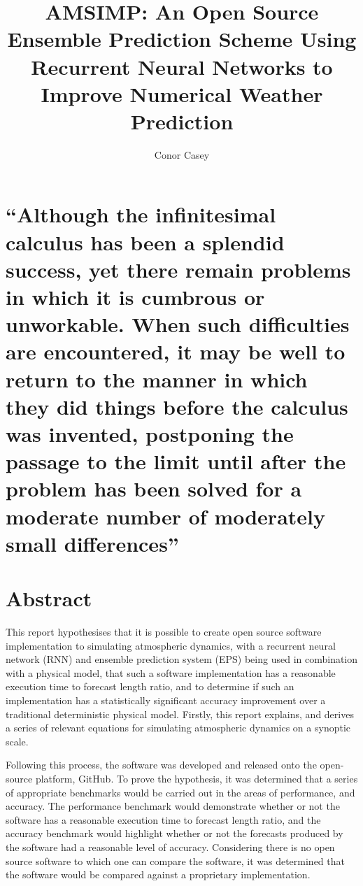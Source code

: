 \documentclass[hidelinks, 12pt]{style}
\title{AMSIMP: An Open Source Ensemble Prediction Scheme Using Recurrent Neural Networks to Improve Numerical Weather Prediction}
\author{Conor Casey}
\begin{document}

\maketitle

\chapter*{
\centering
    ``Although the infinitesimal calculus has been a splendid success, yet there remain problems in which it is cumbrous or unworkable. When such difficulties are encountered, it may be well to return to the manner in which they did things before the calculus was invented, postponing the passage to the limit until after the problem has been solved for a moderate number of moderately small differences”
\\[5pt]
}

\chapter*{Abstract}
This report hypothesises that it is possible to create open source software implementation to simulating atmospheric dynamics, with a recurrent neural network (RNN) and ensemble prediction system (EPS) being used in combination with a physical model, that such a software implementation has a reasonable execution time to forecast length ratio, and to determine if such an implementation has a statistically significant accuracy improvement over a traditional deterministic physical model. Firstly, this report explains, and derives a series of relevant equations for simulating atmospheric dynamics on a synoptic scale.

Following this process, the software was developed and released onto the open-source platform, GitHub. To prove the hypothesis, it was determined that a series of appropriate benchmarks would be carried out in the areas of performance, and accuracy. The performance benchmark would demonstrate whether or not the software has a reasonable execution time to forecast length ratio, and the accuracy benchmark would highlight whether or not the forecasts produced by the software had a reasonable level of accuracy. Considering there is no open source software to which one can compare the software, it was determined that the software would be compared against a proprietary implementation.
\end{document}
